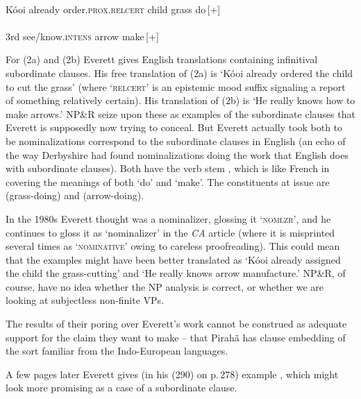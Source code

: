 \documentclass[output=paper,colorlinks,citecolor=brown
]{langscibook}
\begin{document}
\ea \ea \gll {} 
          
           \\
        K{\'o}{\textglotstop}oi already order.\textsc{prox}.\textsc{relcert} 
           child grass do\,[+]\\
    \ex \gll {}  
               \\
             3rd  see/know.\textsc{intens}  arrow make\,[+]\\
   \z
\z

\noindent
For (2a) and (2b) Everett gives English translations containing
infinitival subordinate clauses. His free translation of (2a) is
`K{\'o}{\textglotstop}oi already ordered the child to cut the grass'
(where `\textsc{relcert}' is an epistemic mood suffix signaling a
report of something relatively certain). His translation of (2b)
is `He really knows how to make arrows.' NP\&R seize upon these as
examples of the subordinate clauses that Everett is supposedly
now trying to conceal. But Everett actually took both to be
nominalizations correspond to the subordinate clauses in English
(an echo of the way Derbyshire had found nominalizations doing the
work that English does with subordinate clauses). Both have the
verb stem , which is like French  in covering
the meanings of both `do' and `make'. The constituents at issue are
 (grass-doing) and 
(arrow-doing).

In the 1980s Everett thought \mbox{} was a nominalizer,
glossing it `\textsc{nomlzr}', and he continues to gloss it as
`nominalizer' in the \textit{CA} article (where it is misprinted
several times as `\textsc{nominative}' owing to careless proofreading).
This could mean that the examples might have been better translated
as `K{\'o}{\textglotstop}oi already assigned the child the grass-cutting'
and `He really knows arrow manufacture.' NP\&R, of course, have no idea
whether the NP analysis is correct, or whether we are looking at
subjectless non-finite VPs.

The results of their poring over Everett's work cannot be construed as
adequate support for the claim they want to make -- that Pirah{\~a}
has clause embedding of the sort familiar from the Indo-European
languages.

A few pages later Everett gives (in his (290) on p.\,278) example
,
which might look more promising as a case of a subordinate clause.
\end{document}
